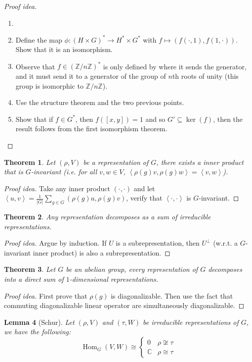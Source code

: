 \documentclass[paper=a4, fontsize=12pt]{scrartcl} %
\newtheorem{thm}{Theorem}
\newtheorem{lem}[thm]{Lemma}
\theoremstyle{definition}
\theoremstyle{remark}
\newcommand{\Z}{\mathbb{Z}}
\DeclareMathOperator{\Hom}{Hom}
\newcommand{\inp}[2]{\left\langle #1, #2 \right\rangle}
\begin{document}
\begin{proof}[Proof idea]
	\begin{enumerate}
		\item[]
		\item Define the map $\phi : (H \times G)^* \rightarrow H^* \times G^*$ with $f \mapsto (f(\cdot, 1), f(1, \cdot))$. Show that it is an isomorphism.
		\item Observe that $f \in (\Z/n\Z)^*$ is only defined by where it sends the generator, and it must send it to a generator of the group of $n$th roots of unity (this group is isomorphic to $\Z/n\Z$).
		\item Use the structure theorem and the two previous points.
		\item Show that if $f \in G^*$, then $f([x,y]) = 1$ and so $G' \subseteq \ker(f)$, then the result follows from the first isomorphism theorem.
	\end{enumerate}
\end{proof}
\begin{thm}
	Let $(\rho, V)$ be a representation of $G$, there exists a inner product that is $G$-invariant (i.e. for all $v,w \in V$, $\inp{\rho(g)v}{\rho(g) w} = \inp{v}{w}$).
\end{thm}
\begin{proof}[Proof idea]
	Take any inner product $(\cdot, \cdot)$ and let $\inp{u}{v} = \frac{1}{|G|}\sum_{g \in G}(\rho(g)u, \rho(g)v)$, verify that $\inp{\cdot}{\cdot}$ is $G$-invariant.
\end{proof}
\begin{thm}
	Any representation decomposes as a sum of irreducible representations.
\end{thm}
\begin{proof}[Proof idea]
	Argue by induction. If $U$ is a subrepresentation, then $U^{\perp}$ (w.r.t. a $G$-invariant inner product) is also a subrepresentation.
\end{proof}
\begin{thm}
	Let $G$ be an abelian group, every representation of $G$ decomposes into a direct sum of $1$-dimensional representations.
\end{thm}
\begin{proof}[Proof idea]
	First prove that $\rho(g)$ is diagonalizable. Then use the fact that commuting diagonalizable linear operator are simultaneously diagonalizable.
\end{proof}
\begin{lem}[Schur]
	Let $(\rho, V)$ and $(\tau, W)$ be irreducible representations of $G$, we have the following: \[\Hom_G(V,W) \cong \begin{cases}0 & \rho \not\cong \tau\\ \mathbb{C} & \rho \cong \tau \end{cases}\]
\end{lem}
\end{document}
